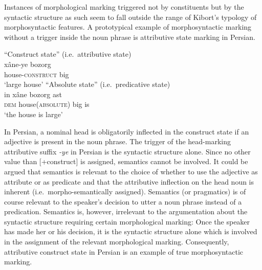 Instances of morphological marking triggered not by constituents but by the syntactic structure as such seem to fall outside the range of Kibort's typology of morphosyntactic features. A prototypical example of morphosyntactic marking without a trigger inside the noun phrase is attributive state marking in Persian.
\begin{exe}
\ex 
{}
\label{persian state}
\begin{xlist}
\ex 
\textrm{“Construct state” (i.e.~attributive state)}\\
\gll 	xâne-ye bozorg\\
	house-\textsc{construct} big\\
\glt 	‘large house’
\ex 
\textrm{“Absolute state” (i.e.~predicative state)}\\
\gll	in xâne bozorg ast\\
	\textsc{dem} house(\textsc{absolute}) big is\\
\glt	‘the house is large’
\end{xlist}
\end{exe}
In Persian, a nominal head is obligatorily inflected in the construct state if an adjective is present in the noun phrase. The trigger of the head-marking attributive suffix \textit{-ye} in Persian is the syntactic structure alone. Since no other value than [+construct] is assigned, semantics cannot be involved. It could be argued that semantics is relevant to the choice of whether to use the adjective as attribute or as predicate and that the attributive inflection on the head noun is inherent (i.e.~morpho-semantically assigned). Semantics (or pragmatics) is of course relevant to the speaker's decision to utter a noun phrase instead of a predication. Semantics is, however, irrelevant to the argumentation about the syntactic structure requiring certain morphological marking: Once the speaker has made her or his decision, it is the syntactic structure alone which is involved in the assignment of the relevant morphological marking. Consequently, attributive construct state in Persian is an example of true morphosyntactic marking.

